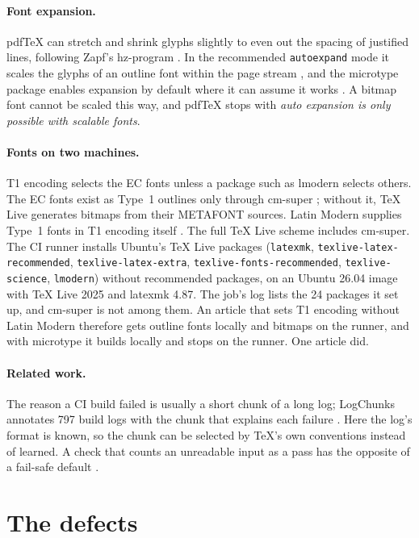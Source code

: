 \documentclass[11pt]{article}
\theoremstyle{plain}
\theoremstyle{definition}
\newcommand{\code}[1]{\texttt{#1}}
\begin{document}
\paragraph{Font expansion.} pdfTeX can stretch and shrink glyphs slightly to even out the spacing
of justified lines, following Zapf's hz-program \cite{thanh2000microtypography,pdftexmanual}. In
the recommended \code{autoexpand} mode it scales the glyphs of an outline font within the page
stream \cite{pdftexmanual}, and the microtype package enables expansion by default where it can
assume it works \cite{schlicht2026microtype}. A bitmap font cannot be scaled this way, and pdfTeX
stops with \emph{auto expansion is only possible with scalable fonts}.

\paragraph{Fonts on two machines.} T1 encoding selects the EC fonts unless a package such as
lmodern selects others. The EC fonts exist as Type~1 outlines only through cm-super
\cite{volovich2008cmsuper}; without it, TeX Live generates bitmaps from their METAFONT sources.
Latin Modern supplies Type~1 fonts in T1 encoding itself \cite{jackowski2021lm}. The full TeX Live
scheme includes cm-super. The CI runner installs Ubuntu's TeX Live packages (\code{latexmk},
\code{texlive-latex-recommended}, \code{texlive-latex-extra}, \code{texlive-fonts-recommended},
\code{texlive-science}, \code{lmodern}) without recommended packages, on an Ubuntu 26.04 image with
TeX Live 2025 and latexmk 4.87. The job's log lists the 24 packages it set up, and cm-super is not
among them. An article that sets T1 encoding without Latin Modern therefore gets outline fonts
locally and bitmaps on the runner, and with microtype it builds locally and stops on the runner.
One article did.

\paragraph{Related work.} The reason a CI build failed is usually a short chunk of a long log;
LogChunks annotates 797 build logs with the chunk that explains each failure
\cite{brandt2020logchunks}. Here the log's format is known, so the chunk can be selected by TeX's
own conventions instead of learned. A check that counts an unreadable input as a pass has the
opposite of a fail-safe default \cite{saltzer1975protection}.

\section{The defects}\label{sec:defects}
\end{document}
